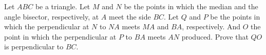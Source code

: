 Let $ABC$ be a triangle. Let $M$ and $N$ be the points in which the median and the angle bisector, respectively, at $A$ meet the side $BC$. Let $Q$ and $P$ be the points in which the perpendicular at $N$ to $NA$ meets $MA$ and $BA$, respectively. And $O$ the point in which the perpendicular at $P$ to $BA$ meets $AN$ produced. Prove that $QO$ is perpendicular to $BC$.